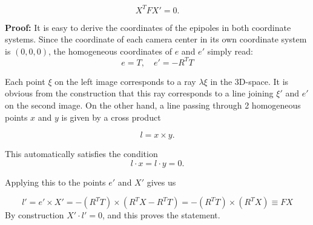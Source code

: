 \documentclass[a4paper,10pt]{article}
\begin{document}
\begin{equation}
 X^T F X' = 0. 
\end{equation}

{\bf Proof:} It is easy to derive the coordinates of the epipoles in both coordinate systems. Since the coordinate of each camera center in its own coordinate system is $(0,0,0)$, the homogeneous coordinates of $e$ and $e'$ simply read:
\begin{equation}
 e = T, \quad e'= - R^TT
\end{equation}

Each point $\xi$ on the left image corresponds to a ray $\lambda \xi$ in the 3D-space. It is obvious from the construction that this ray corresponds to a line joining $\xi'$ and $e'$ on the second image. On the other hand, a line passing through 2 homogeneous points $x$ and $y$ is given by a cross product

\begin{equation}
 l = x \times y. 
\end{equation}

This automatically satisfies the condition 
$$
l\cdot x = l\cdot y = 0.
$$

Applying this to the points $e'$ and $X'$ gives us

\begin{equation}
 l' = e'\times X' = -(R^TT)\times (R^T X - R^T T) = -(R^TT)\times(R^TX)\equiv F X
\end{equation}
By construction $X'\cdot l' = 0$, and this proves the statement.
\end{document}
